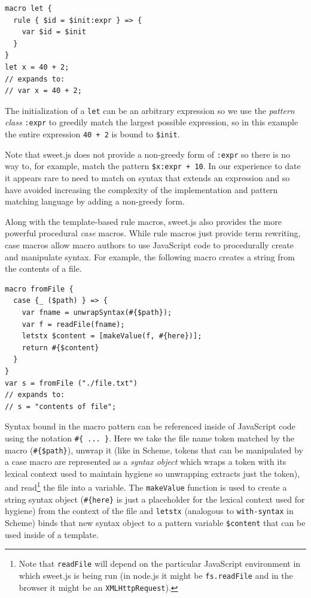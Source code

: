 \documentclass[preprint,10pt]{sigplanconf}
\begin{document}
\begin{lstlisting}
macro let {
  rule { $id = $init:expr } => {
    var $id = $init
  }
}
let x = 40 + 2;
// expands to:
// var x = 40 + 2;
\end{lstlisting}

The initialization of a \verb!let! can be an arbitrary expression so
we use the \emph{pattern class} \verb!:expr! to greedily match the
largest possible expression, so in this example the entire expression
\verb!40 + 2! is bound to \verb!$init!.

Note that sweet.js does not provide a non-greedy form of \verb!:expr!
so there is no way to, for example, match the pattern
\verb!$x:expr + 10!. In our experience to date it appears rare to need
to match on syntax that extends an expression and so have avoided
increasing the complexity of the implementation and pattern matching
language by adding a non-greedy form.

Along with the template-based rule macros, sweet.js also provides the
more powerful procedural \emph{case} macros. 
While rule macros just provide term rewriting, case macros allow macro authors to use JavaScript code to procedurally create and manipulate syntax. 
For example, the following macro creates a string from the contents of a file.
\begin{lstlisting}
macro fromFile {
  case {_ ($path) } => {
    var fname = unwrapSyntax(#{$path});
    var f = readFile(fname);
    letstx $content = [makeValue(f, #{here})];
    return #{$content}
  }
}
var s = fromFile ("./file.txt")
// expands to:
// s = "contents of file";
\end{lstlisting}
Syntax bound in the macro pattern can be referenced inside of
JavaScript code using the notation \verb!#{ ... }!. Here we take the
file name token matched by the macro (\verb!#{$path}!), unwrap it
(like in Scheme, tokens that can be manipulated by a case macro are
represented as a \emph{syntax object} which wraps a token with its
lexical context used to maintain hygiene so unwrapping extracts just
the token), and read\footnote{Note that \verb!readFile! will depend on
  the particular JavaScript environment in which sweet.js is being run
  (\eg in node.js it might be \verb!fs.readFile! and in the browser it
  might be an \verb!XMLHttpRequest!).} the file into a variable. The
\verb!makeValue! function is used to create a string syntax object
(\verb!#{here}! is just a placeholder for the lexical context used for
hygiene) from the context of the file and \verb!letstx! (analogous to
\verb!with-syntax! in Scheme) binds that new syntax object to a
pattern variable \verb!$content! that can be used inside of a
template.
\end{document}
